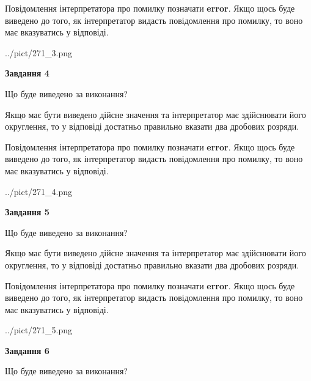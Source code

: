 \documentclass[12pt, ukrainian]{article}
\begin{document}
{\begin {Large}
Повідомлення інтерпретатора про помилку позначати \textbf{error}.
Якщо щось буде виведено до того, як інтерпретатор видасть повідомлення про помилку, 
то воно має вказуватись у відповіді. \par

\begin{center}
	{../pict/271_3.png}
\end{center}
\newpage

{\begin {center}\textbf{Завдання 4}\end {center}}\par
Що буде виведено за виконання? \par

Якщо має бути виведено дійсне значення та інтерпретатор має здійснювати його округлення, 
то у відповіді достатньо правильно вказати два дробових розряди.

Повідомлення інтерпретатора про помилку позначати \textbf{error}.
Якщо щось буде виведено до того, як інтерпретатор видасть повідомлення про помилку, 
то воно має вказуватись у відповіді. \par

\begin{center}
	{../pict/271_4.png}
\end{center}
\newpage

{\begin {center}\textbf{Завдання 5}\end {center}}\par
Що буде виведено за виконання? \par

Якщо має бути виведено дійсне значення та інтерпретатор має здійснювати його округлення, 
то у відповіді достатньо правильно вказати два дробових розряди.

Повідомлення інтерпретатора про помилку позначати \textbf{error}.
Якщо щось буде виведено до того, як інтерпретатор видасть повідомлення про помилку, 
то воно має вказуватись у відповіді. \par

\begin{center}
	{../pict/271_5.png}
\end{center}
\newpage

{\begin {center}\textbf{Завдання 6}\end {center}}\par
Що буде виведено за виконання? \par


\end{Large}}
\end{document}
